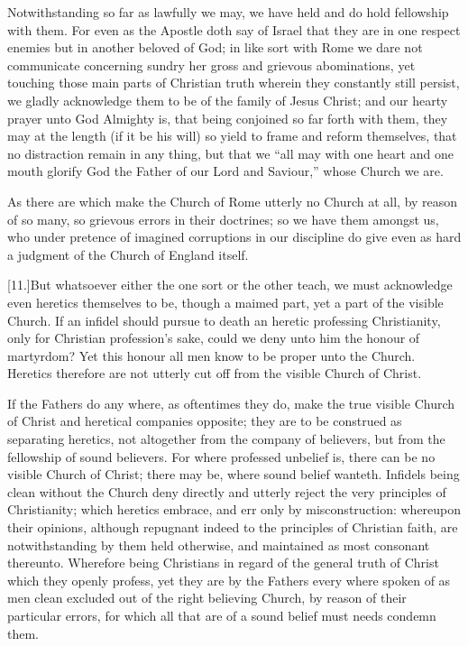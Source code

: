 Notwithstanding so far as lawfully we may, we have held and do hold fellowship with them. For even as the Apostle doth say of Israel that they are in one respect enemies but in another beloved of God; in like sort with Rome we dare not communicate concerning sundry her gross and grievous abominations, yet touching those main parts of Christian truth wherein they constantly still persist, we gladly acknowledge them to be of the family of Jesus Christ; and our hearty prayer unto God Almighty is, that being conjoined so far forth with them, they may at the length (if it be his will) so yield to frame and reform themselves, that no distraction remain in any thing, but that we “all may with one heart and one mouth glorify God the Father of our Lord and Saviour,” whose Church we are.

As there are which make the Church of Rome utterly no Church at all, by reason of so many, so grievous errors in their doctrines; so we have them amongst us, who under pretence of imagined corruptions in our discipline do give even as hard a judgment of the Church of England itself.

[11.]But whatsoever either the one sort or the other teach, we must acknowledge even heretics themselves to be, though a maimed part, yet a part of the visible Church. If an infidel  should pursue to death an heretic professing Christianity, only for Christian profession’s sake, could we deny unto him the honour of martyrdom? Yet this honour all men know to be proper unto the Church. Heretics therefore are not utterly cut off from the visible Church of Christ.

If the Fathers do any where, as oftentimes they do, make the true visible Church of Christ and heretical companies opposite; they are to be construed as separating heretics, not altogether from the company of believers, but from the fellowship of sound believers. For where professed unbelief is, there can be no visible Church of Christ; there may be, where sound belief wanteth. Infidels being clean without the Church deny directly and utterly reject the very principles of Christianity; which heretics embrace, and err only by misconstruction: whereupon their opinions, although repugnant indeed to the principles of Christian faith, are notwithstanding by them held otherwise, and maintained as most consonant thereunto. Wherefore being Christians in regard of the general truth of Christ which they openly profess, yet they are by the Fathers every where spoken of as men clean excluded out of the right believing Church, by reason of their particular errors, for which all that are of a sound belief must needs condemn them.

